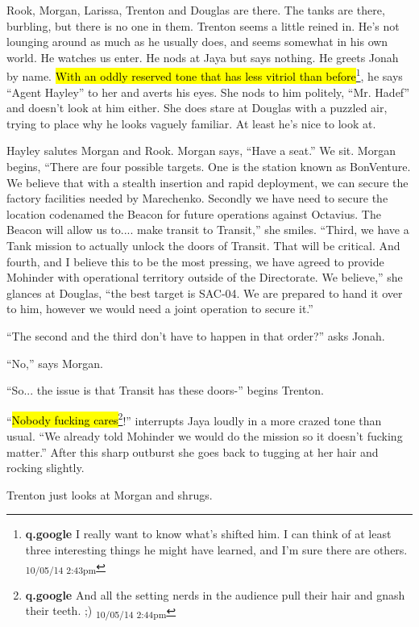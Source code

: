 Rook, Morgan, Larissa, Trenton and Douglas are there.  The tanks are there, burbling, but there is no one in them.  Trenton seems a little reined in.  He's not lounging around as much as he usually does, and seems somewhat in his own world.  He watches us enter.  He nods at Jaya but says nothing.  He greets Jonah by name.   \hl{With an oddly reserved tone that has less vitriol than before}\footnote{\textbf{q.google }I really want to know what's shifted him.  I can think of at least three interesting things he might have learned, and I'm sure there are others. \textsubscript{10/05/14 2:43pm}}, he says ``Agent Hayley'' to her and averts his eyes.  She nods to him politely, ``Mr. Hadef'' and doesn't look at him either.  She does stare at Douglas with a puzzled air, trying to place why he looks vaguely familiar.  At least he's nice to look at.



Hayley salutes Morgan and Rook.  Morgan says, ``Have a seat.''  We sit.  Morgan begins, ``There are four possible targets.  One is the station known as BonVenture.  We believe that with a stealth insertion and rapid deployment, we can secure the factory facilities needed by Marechenko.  Secondly we have need to secure the location codenamed the Beacon for future operations against Octavius.  The Beacon will allow us to.... make transit to Transit,'' she smiles.  ``Third, we have a Tank mission to actually unlock the doors of Transit.  That will be critical.  And fourth, and I believe this to be the most pressing, we have agreed to provide Mohinder with operational territory outside of the Directorate.  We believe,'' she glances at Douglas, ``the best target is SAC-04.  We are prepared to hand it over to him, however we would need a joint operation to secure it.''

``The second and the third don't have to happen in that order?'' asks Jonah.

``No,'' says Morgan.  

``So... the issue is that Transit has these doors-'' begins Trenton.

``\hl{Nobody fucking cares}\footnote{\textbf{q.google }And all the setting nerds in the audience pull their hair and gnash their teeth. ;) \textsubscript{10/05/14 2:44pm}}!'' interrupts Jaya loudly in a more crazed tone than usual.  ``We already told Mohinder we would do the mission so it doesn't fucking matter.''  After this sharp outburst she goes back to tugging at her hair and rocking slightly.

Trenton just looks at Morgan and shrugs.  

